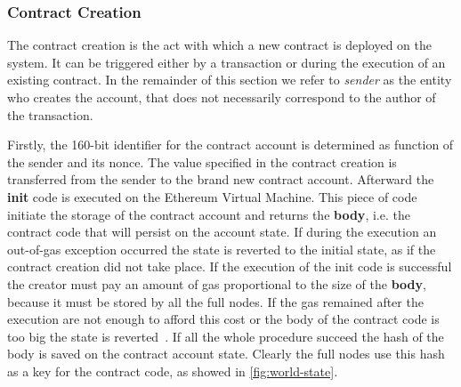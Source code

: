 \subsubsection{Contract Creation}
The contract creation is the act with which a new contract is deployed
on the system. It can be triggered either by a transaction or during the 
execution of an existing contract. In the remainder of this section we refer
to \textit{sender} as the entity who creates the account, that does not 
necessarily correspond to the author of the transaction.

Firstly, the 160-bit identifier for the contract account is determined as
function of the sender and its nonce. The value specified in the contract
creation is transferred from the sender to the brand new contract account.
Afterward the \textbf{init} code is executed on the Ethereum Virtual Machine.
This  piece of code initiate the storage of the contract account and returns the
\textbf{body}, i.e. the contract code that will persist on the account state.
If during the execution an out-of-gas exception occurred the state is reverted
to the initial state, as if the contract creation did not take place.
If the execution of the init code is successful the creator must pay an amount
of gas proportional to the size of the \textbf{body}, because it must be
stored by all the full nodes. If the gas remained after the execution are not
enough to afford this cost or the body of the contract code is too big the
state is reverted~\cite{wood2018ethereum}.
If all the whole procedure succeed the hash of the body is saved on the
contract account state. Clearly the full nodes use this hash as a key for the 
contract code, as showed in \autoref{fig:world-state}.
 